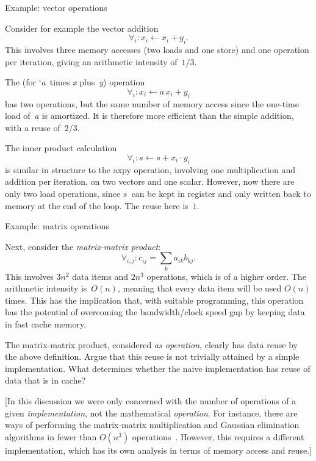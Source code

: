  {Example: vector operations}

Consider for example the vector addition 
\[ \forall_i\colon x_i\leftarrow x_i+y_i.
\]
This involves three memory accesses (two loads and one store) 
and one operation per iteration,
giving an arithmetic intensity of~$1/3$.

The   (for
`\emph{a}~times \emph{x} plus~\emph{y}) operation 
\[ \forall_i\colon x_i\leftarrow a\,x_i+ y_i
\]
has
two operations, but the same number of memory access since the
one-time load of~$a$ is amortized. It is therefore more efficient
than the simple addition, with a reuse of~$2/3$.

The inner product calculation 
\[ \forall_i\colon s\leftarrow s+x_i\cdot y_i
\]
is similar in structure to the axpy operation, involving one
multiplication and addition per iteration, on two vectors and one
scalar. However, now there are only two load operations, since $s$~can
be kept in register and only written back to memory at the end of the
loop. The reuse here is~$1$.

 {Example: matrix operations}
\label{sec:mmp-example}

Next, consider the \emph{matrix-matrix product}:
\[ \forall_{i,j}\colon c_{ij} = \sum_k a_{ik}b_{kj}. \] This involves
$3n^2$ data items and $2n^3$ operations, which is of a
higher order. The arithmetic intensity is~$O(n)$, meaning that every data item
will be used $O(n)$ times.  This has the implication that, with
suitable programming, this operation has the potential of overcoming
the bandwidth/clock speed gap by keeping data in fast cache memory.

\begin{exercise}
  The matrix-matrix product, considered \emph{as operation}, clearly
  has data reuse by the above definition. Argue that this reuse is not
  trivially attained by a simple implementation. What determines
  whether the naive implementation has  reuse of data that is in cache?
\end{exercise}

[In this discussion we were only concerned with the number of
  operations of a given \emph{implementation}, not the mathematical
  \emph{operation}. For instance, there are ways of performing the
  matrix-matrix multiplication and Gaussian elimination algorithms in
  fewer than $O(n^3)$
  operations~\cite{St:gaussnotoptimal,Pa:combinations}. However, this
  requires a different implementation, which has its own analysis in
  terms of memory access and reuse.]

